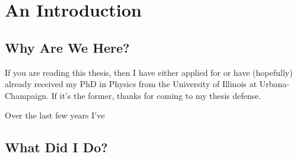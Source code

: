 \chapter{An Introduction}

\section{Why Are We Here?}

If you are reading this thesis, then I have either applied for or have  (hopefully) already received my PhD in Physics from the University of Illinois at Urbana-Champaign. If it's the former, thanks for coming to my thesis defense.

Over the last few years I've 

\section{What Did I Do?}